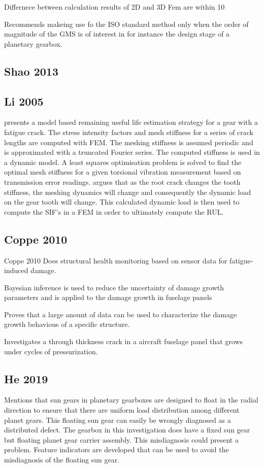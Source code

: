 Differnece between calculation results of 2D and 3D Fem are within 10%

Recommends makeing use fo the ISO standard method only when the order of magnitude of the GMS is of interest in for instance the design stage of a planetary gearbox. 


\subsection{Shao 2013}





\subsection{Li 2005}
\cite{Li2005a} presents a model based remaining useful life estimation strategy for a gear with a fatigue crack. The stress intensity factors and mesh stiffness for a series of crack lengths are computed with FEM. The meshing stiffness is assumed periodic and is approximated with a truncated Fourier series. The computed stiffness is used in a dynamic model. A least squares optimisation problem is solved to find the optimal mesh stiffness for a given torsional vibration measurement based on transmission error readings. \cite{Li2005a} argues that as the root crack changes the tooth stiffness, the meshing dynamics will change and consequently the dynamic load on the gear tooth will change. This calculated dynamic load is then used to compute the SIF's in a FEM in order to ultimately compute the RUL.




\subsection{Coppe 2010} %
Coppe 2010 Does structural health monitoring based on sensor data for fatigue-induced damage. 

Bayesian inference is used to reduce the uncertainty of damage growth parameters and is applied to the damage growth in fuselage panels

Proves that a large anount of data can be used to characterize the damage growth behavious of a specific structure.

Investigates a through thickness crack in a aircraft fuselage panel that grows under cycles of pressurization.

\subsection{He 2019}
Mentions that sun gears in planetary gearboxes are designed to float in the radial direction to ensure that there are uniform load distribution among different planet gears. This floating sun gear can easily be wrongly diagnosed as a distributed defect. The gearbox in this investigation does have a fixed sun gear but floating planet gear carrier assembly. This misdiagnosis could present a problem. Feature indicators are developed that can be used to avoid the misdiagnosis of the floating sun gear.


